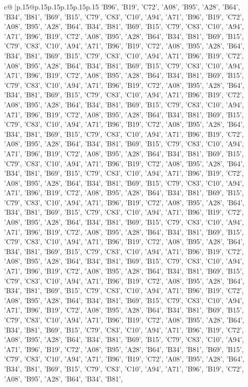 \documentclass{article}
\begin{document}
{\begin{supertabular}{c@{$\;$}|p{.15\linewidth}@{}p{.15\linewidth}p{.15\linewidth}p{.15\linewidth}p{.15\linewidth}p{.15\linewidth}}
{{{{{'B96', 'B19', 'C72', 'A08', 'B95', 'A28', 'B64', 'B34', 'B81', 'B69', 'B15', 'C79', 'C83', 'C10', 'A94', 'A71', 'B96', 'B19', 'C72', 'A08', 'B95', 'A28', 'B64', 'B34', 'B81', 'B69', 'B15', 'C79', 'C83', 'C10', 'A94', 'A71', 'B96', 'B19', 'C72', 'A08', 'B95', 'A28', 'B64', 'B34', 'B81', 'B69', 'B15', 'C79', 'C83', 'C10', 'A94', 'A71', 'B96', 'B19', 'C72', 'A08', 'B95', 'A28', 'B64', 'B34', 'B81', 'B69', 'B15', 'C79', 'C83', 'C10', 'A94', 'A71', 'B96', 'B19', 'C72', 'A08', 'B95', 'A28', 'B64', 'B34', 'B81', 'B69', 'B15', 'C79', 'C83', 'C10', 'A94', 'A71', 'B96', 'B19', 'C72', 'A08', 'B95', 'A28', 'B64', 'B34', 'B81', 'B69', 'B15', 'C79', 'C83', 'C10', 'A94', 'A71', 'B96', 'B19', 'C72', 'A08', 'B95', 'A28', 'B64', 'B34', 'B81', 'B69', 'B15', 'C79', 'C83', 'C10', 'A94', 'A71', 'B96', 'B19', 'C72', 'A08', 'B95', 'A28', 'B64', 'B34', 'B81', 'B69', 'B15', 'C79', 'C83', 'C10', 'A94', 'A71', 'B96', 'B19', 'C72', 'A08', 'B95', 'A28', 'B64', 'B34', 'B81', 'B69', 'B15', 'C79', 'C83', 'C10', 'A94', 'A71', 'B96', 'B19', 'C72', 'A08', 'B95', 'A28', 'B64', 'B34', 'B81', 'B69', 'B15', 'C79', 'C83', 'C10', 'A94', 'A71', 'B96', 'B19', 'C72', 'A08', 'B95', 'A28', 'B64', 'B34', 'B81', 'B69', 'B15', 'C79', 'C83', 'C10', 'A94', 'A71', 'B96', 'B19', 'C72', 'A08', 'B95', 'A28', 'B64', 'B34', 'B81', 'B69', 'B15', 'C79', 'C83', 'C10', 'A94', 'A71', 'B96', 'B19', 'C72', 'A08', 'B95', 'A28', 'B64', 'B34', 'B81', 'B69', 'B15', 'C79', 'C83', 'C10', 'A94', 'A71', 'B96', 'B19', 'C72', 'A08', 'B95', 'A28', 'B64', 'B34', 'B81', 'B69', 'B15', 'C79', 'C83', 'C10', 'A94', 'A71', 'B96', 'B19', 'C72', 'A08', 'B95', 'A28', 'B64', 'B34', 'B81', 'B69', 'B15', 'C79', 'C83', 'C10', 'A94', 'A71', 'B96', 'B19', 'C72', 'A08', 'B95', 'A28', 'B64', 'B34', 'B81', 'B69', 'B15', 'C79', 'C83', 'C10', 'A94', 'A71', 'B96', 'B19', 'C72', 'A08', 'B95', 'A28', 'B64', 'B34', 'B81', 'B69', 'B15', 'C79', 'C83', 'C10', 'A94', 'A71', 'B96', 'B19', 'C72', 'A08', 'B95', 'A28', 'B64', 'B34', 'B81', 'B69', 'B15', 'C79', 'C83', 'C10', 'A94', 'A71', 'B96', 'B19', 'C72', 'A08', 'B95', 'A28', 'B64', 'B34', 'B81', 'B69', 'B15', 'C79', 'C83', 'C10', 'A94', 'A71', 'B96', 'B19', 'C72', 'A08', 'B95', 'A28', 'B64', 'B34', 'B81', 'B69', 'B15', 'C79', 'C83', 'C10', 'A94', 'A71', 'B96', 'B19', 'C72', 'A08', 'B95', 'A28', 'B64', 'B34', 'B81', 'B69', 'B15', 'C79', 'C83', 'C10', 'A94', 'A71', 'B96', 'B19', 'C72', 'A08', 'B95', 'A28', 'B64', 'B34', 'B81', 'B69', 'B15', 'C79', 'C83', 'C10', 'A94', 'A71', 'B96', 'B19', 'C72', 'A08', 'B95', 'A28', 'B64', 'B34', 'B81', 'B69', 'B15', 'C79', 'C83', 'C10', 'A94', 'A71', 'B96', 'B19', 'C72', 'A08', 'B95', 'A28', 'B64', 'B34', 'B81', 'B69', 'B15', 'C79', 'C83', 'C10', 'A94', 'A71', 'B96', 'B19', 'C72', 'A08', 'B95', 'A28', 'B64', 'B34', 'B81', 'B69', 'B15', 'C79', 'C83', 'C10', 'A94', 'A71', 'B96', 'B19', 'C72', 'A08', 'B95', 'A28', 'B64', 'B34', 'B81', 'B69', 'B15', 'C79', 'C83', 'C10', 'A94', 'A71', 'B96', 'B19', 'C72', 'A08', 'B95', 'A28', 'B64', 'B34', 'B81', 'B69', 'B15', 'C79', 'C83', 'C10', 'A94', 'A71', 'B96', 'B19', 'C72', 'A08', 'B95', 'A28', 'B64', 'B34', 'B81', 'B69', 'B15', 'C79', 'C83', 'C10', 'A94', 'A71', 'B96', 'B19', 'C72', 'A08', 'B95', 'A28', 'B64', 'B34', 'B81', }}}}}
\end{supertabular}}
\end{document}
